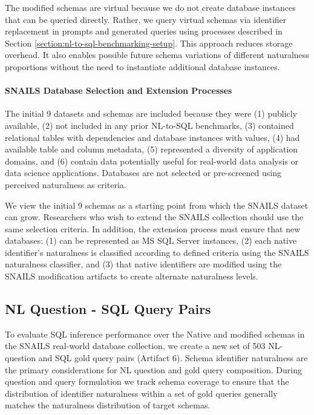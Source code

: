 The modified schemas are virtual because we do not create database instances that can be queried directly.
Rather, we query virtual schemas via identifier replacement in prompts and generated queries using processes described in Section \ref{section:nl-to-sql-benchmarking-setup}.
This approach reduces storage overhead.
It also enables possible future schema variations of different naturalness proportions without the need to instantiate additional database instances.

\paragraph{\textbf{SNAILS Database Selection and Extension Processes}}
The initial 9 datasets and schemas are included because they were (1) publicly available, (2) not included in any prior NL-to-SQL benchmarks, (3) contained relational tables with dependencies and database instances with values, (4) had available table and column metadata, (5) represented a diversity of application domains, and (6) contain data potentially useful for real-world data analysis or data science applications.
Databases are not selected or pre-screened using perceived naturalness as criteria.

We view the initial 9 schemas as a starting point from which the SNAILS dataset can grow.
Researchers who wish to extend the SNAILS collection should use the same selection criteria.
In addition, the extension process must ensure that new databases:  (1) can be represented as MS SQL Server instances, (2) each native identifier's naturalness is classified according to defined criteria using the SNAILS naturalness classifier, and (3) that native identifiers are modified using the SNAILS modification artifacts to create alternate naturalness levels. 

\subsection{NL Question - SQL Query Pairs}

To evaluate SQL inference performance over the Native and modified schemas in the SNAILS real-world database collection, we create a new set of 503 NL-question and SQL gold query pairs (Artifact 6).
Schema identifier naturalness are the primary considerations for NL question and gold query composition.
During question and query formulation we track schema coverage to ensure that the distribution of identifier naturalness within a set of gold queries generally matches the naturalness distribution of target schemas.

